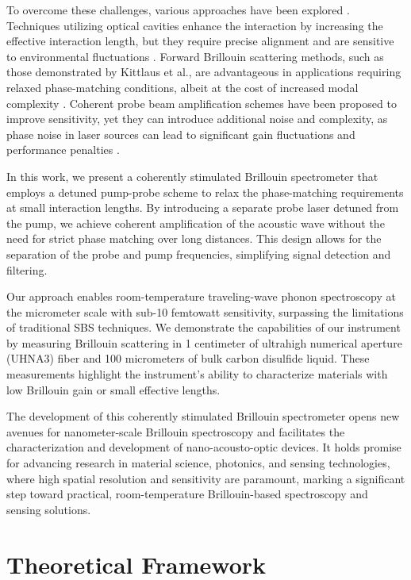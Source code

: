 \documentclass[%
  reprint,
  superscriptaddress,
  amsmath,amssymb,
  aps,
  prapplied,
]{revtex4-2}
\begin{document}
To overcome these challenges, various approaches have been explored \cite{shin2013tailorable, van2015interaction, kittlaus2016large}. Techniques utilizing optical cavities enhance the interaction by increasing the effective interaction length, but they require precise alignment and are sensitive to environmental fluctuations \cite{pant2011cavity}. Forward Brillouin scattering methods, such as those demonstrated by Kittlaus et al., are advantageous in applications requiring relaxed phase-matching conditions, albeit at the cost of increased modal complexity \cite{kittlaus2017chip}. Coherent probe beam amplification schemes have been proposed to improve sensitivity, yet they can introduce additional noise and complexity, as phase noise in laser sources can lead to significant gain fluctuations and performance penalties \cite{shlomovits2015effect}.

In this work, we present a coherently stimulated Brillouin spectrometer that employs a detuned pump-probe scheme to relax the phase-matching requirements at small interaction lengths. By introducing a separate probe laser detuned from the pump, we achieve coherent amplification of the acoustic wave without the need for strict phase matching over long distances. This design allows for the separation of the probe and pump frequencies, simplifying signal detection and filtering.

Our approach enables room-temperature traveling-wave phonon spectroscopy at the micrometer scale with sub-10 femtowatt sensitivity, surpassing the limitations of traditional SBS techniques. We demonstrate the capabilities of our instrument by measuring Brillouin scattering in 1 centimeter of ultrahigh numerical aperture (UHNA3) fiber and 100 micrometers of bulk carbon disulfide liquid. These measurements highlight the instrument's ability to characterize materials with low Brillouin gain or small effective lengths.

The development of this coherently stimulated Brillouin spectrometer opens new avenues for nanometer-scale Brillouin spectroscopy and facilitates the characterization and development of nano-acousto-optic devices. It holds promise for advancing research in material science, photonics, and sensing technologies, where high spatial resolution and sensitivity are paramount, marking a significant step toward practical, room-temperature Brillouin-based spectroscopy and sensing solutions.

\section{Theoretical Framework}
\label{Theoretical Framework}
\end{document}
